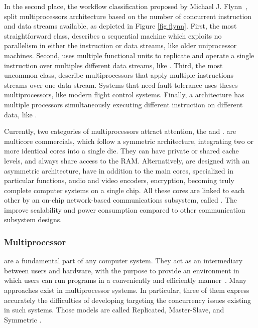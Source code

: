 			In the second place, the workflow classification proposed by Michael J. Flynn~\cite{flynn:1972},
			split multiprocessors architecture based on the number of concurrent
			instruction and data streams available, as depicted in Figure \ref{fig.flynn}.
			First, the most straightforward class, \sisd describes a sequential
			machine which exploits no parallelism in either the instruction or
			data streams, like older uniprocessor machines.
			Second, \simd uses multiple functional units to replicate and operate
			a single instruction over multiples different data streams, like \gpu.
			Third, the most uncommon class, \misd describe multiprocessors that
			apply multiple instructions streams over one data stream.
			Systems that need fault tolerance uses theses multiprocessors, like
			modern flight control systems.
			Finally, a \mimd architecture has multiple processors simultaneously
			executing different instruction on different data, like \xeonphi.

			Currently, two categories of multiprocessors attract attention, the \cmp and \mpsoc.
			\cmps are multicore commercials, which follow a symmetric architecture,
			integrating two or more identical cores into a single die.
			They can have private or shared cache levels, and always share access
			to the RAM.
			Alternatively, \mpsocs are designed with an asymmetric architecture,
			have in addition to the main cores, specialized \cpus in particular
			functions, \eg audio and video encoders, encryption, becoming truly
			complete computer systems on a single chip.
			All these cores are linked to each other by an on-chip network-based
			communications subsystem, called \noc.
			The \noc improve scalability and power consumption compared to other
			communication subsystem designs.

		\subsubsection{Multiprocessor \oses}
		\label{sec.multiprocessor-os}

			\oses are a fundamental part of any computer system.
			They act as an intermediary between users and hardware, with the
			purpose to provide an environment in which users can run programs
			in a conveniently and efficiently manner~\cite{Silberschatz:9ed}.
			Many \os approaches exist in multiprocessor systems.
			In particular, three of them express accurately the difficulties
			of developing \oses targeting the concurrency issues existing in
			such systems.
			Those models are called Replicated, Master-Slave, and Symmetric \os.

